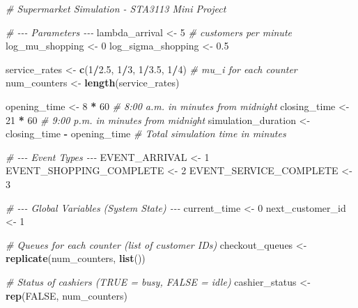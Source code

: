 \documentclass[
]{article}
\newenvironment{Shaded}{\begin{snugshade}}{\end{snugshade}}
\newcommand{\CommentTok}[1]{\textcolor[rgb]{0.56,0.35,0.01}{\textit{#1}}}
\newcommand{\ConstantTok}[1]{\textcolor[rgb]{0.56,0.35,0.01}{#1}}
\newcommand{\DecValTok}[1]{\textcolor[rgb]{0.00,0.00,0.81}{#1}}
\newcommand{\FloatTok}[1]{\textcolor[rgb]{0.00,0.00,0.81}{#1}}
\newcommand{\FunctionTok}[1]{\textcolor[rgb]{0.13,0.29,0.53}{\textbf{#1}}}
\newcommand{\NormalTok}[1]{#1}
\newcommand{\OtherTok}[1]{\textcolor[rgb]{0.56,0.35,0.01}{#1}}
\newcommand{\SpecialCharTok}[1]{\textcolor[rgb]{0.81,0.36,0.00}{\textbf{#1}}}
\begin{document}
\begin{Shaded}
\begin{Highlighting}[]
\CommentTok{\# Supermarket Simulation {-} STA3113 Mini Project}

\CommentTok{\# {-}{-}{-} Parameters {-}{-}{-}}
\NormalTok{lambda\_arrival }\OtherTok{\textless{}{-}} \DecValTok{5} \CommentTok{\# customers per minute}
\NormalTok{log\_mu\_shopping }\OtherTok{\textless{}{-}} \DecValTok{0}
\NormalTok{log\_sigma\_shopping }\OtherTok{\textless{}{-}} \FloatTok{0.5}

\NormalTok{service\_rates }\OtherTok{\textless{}{-}} \FunctionTok{c}\NormalTok{(}\DecValTok{1}\SpecialCharTok{/}\FloatTok{2.5}\NormalTok{, }\DecValTok{1}\SpecialCharTok{/}\DecValTok{3}\NormalTok{, }\DecValTok{1}\SpecialCharTok{/}\FloatTok{3.5}\NormalTok{, }\DecValTok{1}\SpecialCharTok{/}\DecValTok{4}\NormalTok{) }\CommentTok{\# mu\_i for each counter}
\NormalTok{num\_counters }\OtherTok{\textless{}{-}} \FunctionTok{length}\NormalTok{(service\_rates)}

\NormalTok{opening\_time }\OtherTok{\textless{}{-}} \DecValTok{8} \SpecialCharTok{*} \DecValTok{60} \CommentTok{\# 8:00 a.m. in minutes from midnight}
\NormalTok{closing\_time }\OtherTok{\textless{}{-}} \DecValTok{21} \SpecialCharTok{*} \DecValTok{60} \CommentTok{\# 9:00 p.m. in minutes from midnight}
\NormalTok{simulation\_duration }\OtherTok{\textless{}{-}}\NormalTok{ closing\_time }\SpecialCharTok{{-}}\NormalTok{ opening\_time }
\CommentTok{\# Total simulation time in minutes}

\CommentTok{\# {-}{-}{-} Event Types {-}{-}{-}}
\NormalTok{EVENT\_ARRIVAL }\OtherTok{\textless{}{-}} \DecValTok{1}
\NormalTok{EVENT\_SHOPPING\_COMPLETE }\OtherTok{\textless{}{-}} \DecValTok{2}
\NormalTok{EVENT\_SERVICE\_COMPLETE }\OtherTok{\textless{}{-}} \DecValTok{3}

\CommentTok{\# {-}{-}{-} Global Variables (System State) {-}{-}{-}}
\NormalTok{current\_time }\OtherTok{\textless{}{-}} \DecValTok{0}
\NormalTok{next\_customer\_id }\OtherTok{\textless{}{-}} \DecValTok{1}

\CommentTok{\# Queues for each counter (list of customer IDs)}
\NormalTok{checkout\_queues }\OtherTok{\textless{}{-}} \FunctionTok{replicate}\NormalTok{(num\_counters, }\FunctionTok{list}\NormalTok{())}

\CommentTok{\# Status of cashiers (TRUE = busy, FALSE = idle)}
\NormalTok{cashier\_status }\OtherTok{\textless{}{-}} \FunctionTok{rep}\NormalTok{(}\ConstantTok{FALSE}\NormalTok{, num\_counters)}


\end{Highlighting}
\end{Shaded}
\end{document}
